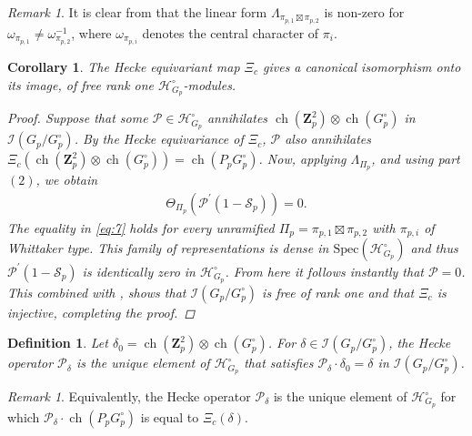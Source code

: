 \documentclass{amsart}%
\theoremstyle{plain}
\newtheorem{cor}[thm]{Corollary}
\theoremstyle{plain}
\newtheorem{defn}[thm]{Definition}
\theoremstyle{remark}
\newtheorem{rem}[thm]{Remark}
\DeclareMathOperator{\ch}{ch}
\begin{document}
\begin{rem}
    It is clear from  that the linear form $\Lambda_{\pi_{p,1}\boxtimes \pi_{p,2}}$ is non-zero for $\omega_{\pi_{p,1}}\neq \omega_{\pi_{p,2}}^{-1}$, where $\omega_{\pi_{p,i}}$ denotes the central character of $\pi_i.$
\end{rem}
\begin{cor}
     The Hecke equivariant map $\Xi_c$ gives a canonical isomorphism onto its image, of free rank one $\mathcal{H}_{G_p}^\circ$-modules.
    \begin{proof}
        Suppose that some $\mathcal{P}\in\mathcal{H}_{G_p}^\circ$ annihilates $\ch(\mathbf{Z}_p^2)\otimes \ch(G_p^\circ)$ in $\mathcal{I}(G_p/G_p^\circ)$. By the Hecke equivariance of $\Xi_c$, $\mathcal{P}$ also annihilates $\Xi_c(\ch(\mathbf{Z}_p^2)\otimes \ch(G_p^\circ))=\ch(P_pG_p^\circ)$. Now, applying $\Lambda_{\Pi_p}$, and using  part $(2)$, we obtain 
        \begin{align}
            \Theta_{\Pi_p}\left(\mathcal{P}^{'}(1-\mathcal{S}_p)\right)=0.
        \end{align}
        The equality in \eqref{eq:7} holds for every unramified $\Pi_p=\pi_{p,1}\boxtimes\pi_{p,2}$ with $\pi_{p,i}$ of Whittaker type. This family of representations is dense in $\mathrm{Spec}(\mathcal{H}_{G_p}^\circ)$ and thus $\mathcal{P}^{'}(1-\mathcal{S}_p)$ is identically zero in $\mathcal{H}_{G_p}^\circ$. From here it follows instantly that $\mathcal{P}=0$. This combined with , shows that $\mathcal{I}(G_p/G_p^\circ)$ is free of rank one and that $\Xi_c$ is injective, completing the proof.
    \end{proof}
\end{cor}
\begin{defn}
     Let $\delta_0=\ch(\mathbf{Z}_p^2)\otimes \ch(G_p^\circ)$. For $\delta\in\mathcal{I}(G_p/G_p^\circ)$, the Hecke operator $\mathcal{P}_\delta$ is the unique element of $\mathcal{H}_{G_p}^\circ$ that satisfies $\mathcal{P}_\delta\cdot\delta_0=\delta$ in $\mathcal{I}(G_p/G_p^\circ)$. 
\end{defn}
\begin{rem}
    Equivalently, the Hecke operator $\mathcal{P}_\delta$ is the unique element of $\mathcal{H}_{G_p}^\circ$ for which $\mathcal{P}_\delta\cdot \ch(P_pG_p^\circ)$ is equal to $\Xi_c(\delta)$.
\end{rem}
\end{document}
